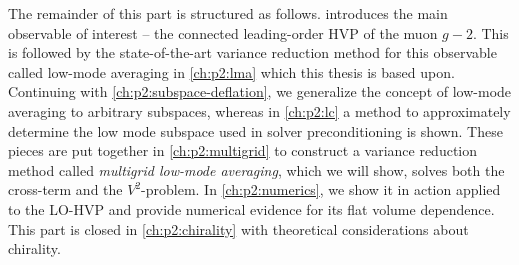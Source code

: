 The remainder of this part is structured as follows.
 introduces the main observable of interest -- the connected leading-order HVP of the muon $g-2$.
This is followed by the state-of-the-art variance reduction method for this observable called low-mode averaging in \cref{ch:p2:lma} which this thesis is based upon.
Continuing with \cref{ch:p2:subspace-deflation}, we generalize the concept of low-mode averaging to arbitrary subspaces, whereas in \cref{ch:p2:lc} a method to approximately determine the low mode subspace used in solver preconditioning is shown.
These pieces are put together in \cref{ch:p2:multigrid} to construct a variance reduction method called \emph{multigrid low-mode averaging}, which we will show, solves both the cross-term and the $V^{2}$-problem.
In \cref{ch:p2:numerics}, we show it in action applied to the LO-HVP and provide numerical evidence for its flat volume dependence.
This part is closed in \cref{ch:p2:chirality} with theoretical considerations about chirality.


